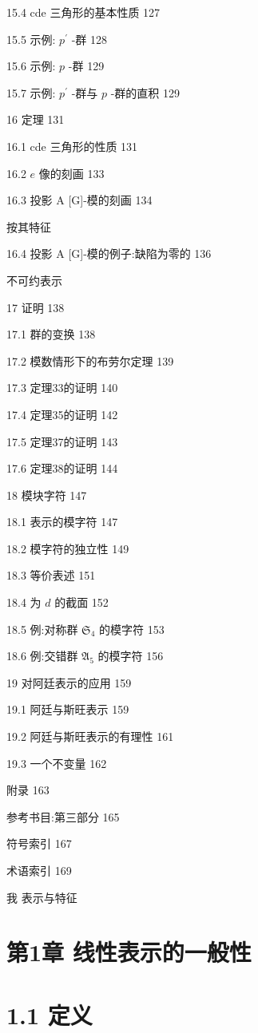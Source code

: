 \documentclass[10pt]{article}
\begin{document}
15.4 cde 三角形的基本性质 127

15.5 示例: \({p}^{\prime }\) -群 128

15.6 示例: \(p\) -群 129

15.7 示例: \({p}^{\prime }\) -群与 \(p\) -群的直积 129

16 定理 131

16.1 cde 三角形的性质 131

16.2 \(e\) 像的刻画 133

16.3 投影 A [G]-模的刻画 134

按其特征

16.4 投影 A [G]-模的例子:缺陷为零的 136

不可约表示

17 证明 138

17.1 群的变换 138

17.2 模数情形下的布劳尔定理 139

17.3 定理33的证明 140

17.4 定理35的证明 142

17.5 定理37的证明 143

17.6 定理38的证明 144

18 模块字符 147

18.1 表示的模字符 147

18.2 模字符的独立性 149

18.3 等价表述 151

18.4 为 \(d\) 的截面 152

18.5 例:对称群 \({\mathfrak{S}}_{4}\) 的模字符 153

18.6 例:交错群 \({\mathfrak{A}}_{5}\) 的模字符 156

19 对阿廷表示的应用 159

19.1 阿廷与斯旺表示 159

19.2 阿廷与斯旺表示的有理性 161

19.3 一个不变量 162

附录 163

参考书目:第三部分 165

符号索引 167

术语索引 169

我 表示与特征

\section*{第1章 线性表示的一般性}

\section*{1.1 定义}
\end{document}
